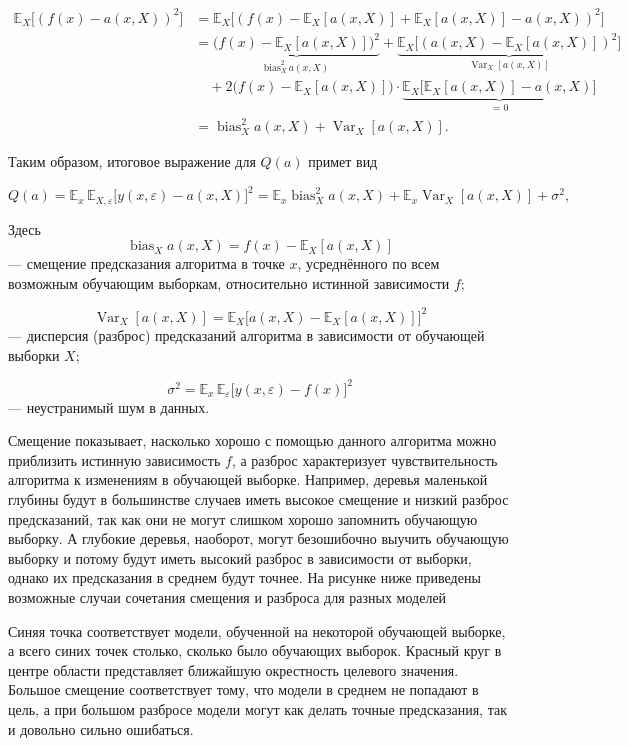 \begin{align*}
    \mathbb{E}_{X}\bigl[(f(x) - a(x,X))^{2}\bigr]
    &= \mathbb{E}_{X}\bigl[(f(x) - \mathbb{E}_{X}[a(x,X)] + \mathbb{E}_{X}[a(x,X)] - a(x,X))^{2}\bigr] \\
    &= \underbrace{\bigl(f(x) - \mathbb{E}_{X}[a(x,X)]\bigr)^{2}}_{\text{bias}_{X}^{2}\,a(x,X)}
    + \underbrace{\mathbb{E}_{X}\bigl[(a(x,X) - \mathbb{E}_{X}[a(x,X)])^{2}\bigr]}_{\operatorname{Var}_{X}[a(x,X)]} \\
    &\quad + 2\bigl(f(x) - \mathbb{E}_{X}[a(x,X)]\bigr)\cdot
    \underbrace{\mathbb{E}_{X}\bigl[\mathbb{E}_{X}[a(x,X)] - a(x,X)\bigr]}_{=0} \\
    &= \operatorname{bias}_{X}^{2}a(x,X) + \operatorname{Var}_{X}[a(x,X)].
\end{align*}

Таким образом, итоговое выражение для $Q(a)$ примет вид

\[ Q(a) = \mathbb{E}_{x}\,\mathbb{E}_{X,\varepsilon}\bigl[y(x,\varepsilon) - a(x,X)\bigr]^{2}
= \mathbb{E}_{x}\operatorname{bias}_{X}^{2}a(x,X)
+ \mathbb{E}_{x}\operatorname{Var}_{X}[a(x,X)]
+ \sigma^{2}, \]

Здесь
\[ \operatorname{bias}_{X}a(x,X) = f(x) - \mathbb{E}_{X}[a(x,X)] \] --- смещение предсказания алгоритма в точке $x$,
усреднённого по всем возможным обучающим выборкам, относительно истинной зависимости $f$;

\[ \operatorname{Var}_{X}[a(x,X)] = \mathbb{E}_{X}\bigl[a(x,X) - \mathbb{E}_{X}[a(x,X)]\bigr]^{2} \]
--- дисперсия (разброс) предсказаний алгоритма в зависимости от обучающей выборки $X$;

\[ \sigma^{2} = \mathbb{E}_{x}\,\mathbb{E}_{\varepsilon}\bigl[y(x,\varepsilon) - f(x)\bigr]^{2} \]
--- неустранимый шум в данных.

Смещение показывает, насколько хорошо с помощью данного алгоритма можно приблизить истинную зависимость $f$, а
разброс характеризует чувствительность алгоритма к изменениям в обучающей выборке.
Например, деревья маленькой глубины будут в большинстве случаев иметь высокое смещение и низкий разброс предсказаний,
так как они не могут слишком хорошо запомнить обучающую выборку.
А глубокие деревья, наоборот, могут безошибочно выучить обучающую выборку и потому будут иметь высокий разброс в
зависимости от выборки, однако их предсказания в среднем будут точнее.
На рисунке ниже приведены возможные случаи сочетания смещения и разброса для разных моделей

Синяя точка соответствует модели, обученной на некоторой обучающей выборке, а всего синих точек столько, сколько
было обучающих выборок.
Красный круг в центре области представляет ближайшую окрестность целевого значения.
Большое смещение соответствует тому, что модели в среднем не попадают в цель, а при большом разбросе модели могут
как делать точные предсказания, так и довольно сильно ошибаться.

